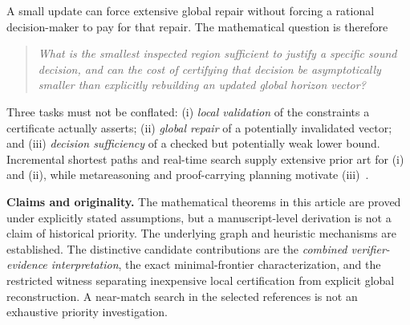 \documentclass[11pt,letterpaper]{article}
\theoremstyle{definition}
\theoremstyle{remark}
\begin{document}
A small update can force extensive global repair without forcing a rational decision-maker to pay for that repair. The mathematical question is therefore
\begin{quote}\itshape
What is the smallest inspected region sufficient to justify a specific sound decision, and can the cost of certifying that decision be asymptotically smaller than explicitly rebuilding an updated global horizon vector?
\end{quote}

Three tasks must not be conflated: (i) \emph{local validation} of the constraints a certificate actually asserts; (ii) \emph{global repair} of a potentially invalidated vector; and (iii) \emph{decision sufficiency} of a checked but potentially weak lower bound. Incremental shortest paths and real-time search supply extensive prior art for (i) and (ii), while metareasoning and proof-carrying planning motivate (iii)~\cite{Bellman,Koenig2004,Ramalingam1996,Russell1991,Mugdan2023,Dold2025}.

\textbf{Claims and originality.} The mathematical theorems in this article are proved under explicitly stated assumptions, but a manuscript-level derivation is not a claim of historical priority. The underlying graph and heuristic mechanisms are established. The distinctive candidate contributions are the \emph{combined verifier-evidence interpretation}, the exact minimal-frontier characterization, and the restricted witness separating inexpensive local certification from explicit global reconstruction. A near-match search in the selected references is not an exhaustive priority investigation.
\end{document}
